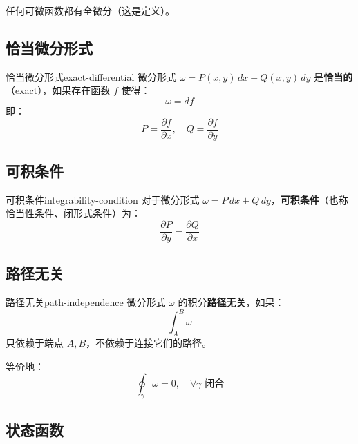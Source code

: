 \documentclass[12pt,a4paper]{article}
\begin{document}
\begin{keypoint}
任何可微函数都有全微分（这是定义）。
\end{keypoint}

\subsection{恰当微分形式}

\begin{definition}{恰当微分形式}{exact-differential}
微分形式 $\omega = P(x,y)\,dx + Q(x,y)\,dy$ 是\textbf{恰当的}（exact），如果存在函数 $f$ 使得：
\begin{equation}
\omega = df
\end{equation}
即：
\begin{equation}
P = \frac{\partial f}{\partial x}, \quad Q = \frac{\partial f}{\partial y}
\end{equation}
\end{definition}

\subsection{可积条件}

\begin{definition}{可积条件}{integrability-condition}
对于微分形式 $\omega = P\,dx + Q\,dy$，\textbf{可积条件}（也称恰当性条件、闭形式条件）为：
\begin{equation}
\boxed{\frac{\partial P}{\partial y} = \frac{\partial Q}{\partial x}}
\end{equation}
\end{definition}

\subsection{路径无关}

\begin{definition}{路径无关}{path-independence}
微分形式 $\omega$ 的积分\textbf{路径无关}，如果：
\begin{equation}
\int_A^B \omega
\end{equation}
只依赖于端点 $A, B$，不依赖于连接它们的路径。

等价地：
\begin{equation}
\oint_\gamma \omega = 0, \quad \forall \gamma \text{ 闭合}
\end{equation}
\end{definition}

\subsection{状态函数}
\end{document}
